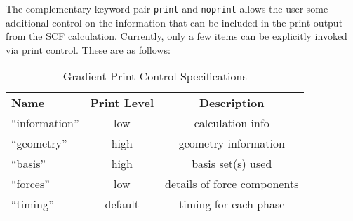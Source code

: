 


The complementary keyword pair \verb+print+ and \verb+noprint+ allows
the user some additional control on the information that can be
included in the print output from the SCF calculation.  Currently,
only a few items can be explicitly invoked via print control.  These
are as follows:
 

\begin{table}[htbp]
\begin{center}
\begin{tabular}{lcc}
  {\bf Name}       & {\bf Print Level} & {\bf Description} \\
 ``information''   &       low         & calculation info\\
 ``geometry''      &      high         & geometry information\\
 ``basis''         &      high         & basis set(s) used\\
 ``forces''        &       low         & details of force components\\
 ``timing''        &     default       & timing for each phase\\
\end{tabular}
\end{center}
\caption{Gradient Print Control Specifications}
\end{table}


